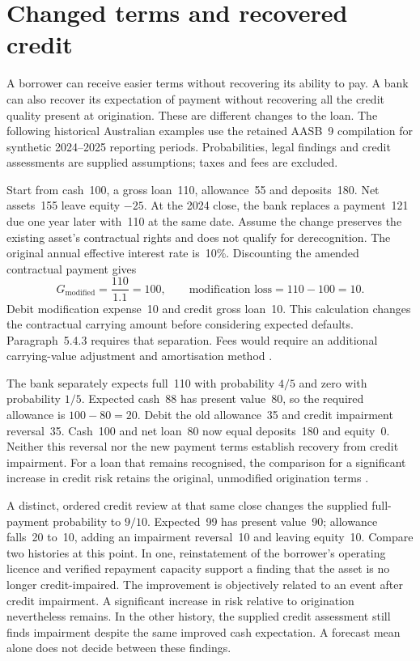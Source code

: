 \section{Changed terms and recovered credit}\label{sec:bank-restructuring}

A borrower can receive easier terms without recovering its ability to pay.
A bank can also recover its expectation of payment without recovering all
the credit quality present at origination. These are different changes to
the loan. The following historical Australian examples use the retained
AASB~9 compilation for synthetic 2024--2025 reporting periods. Probabilities,
legal findings and credit assessments are supplied assumptions; taxes and
fees are excluded.

Start from cash~100, a gross loan~110, allowance~55 and deposits~180. Net assets~155
leave equity $-25$. At the 2024 close, the bank replaces a payment~121 due
one year later with~110 at the same date. Assume the change preserves the
existing asset's contractual rights and does not qualify for derecognition.
The original annual effective interest rate is~10\%. Discounting the amended
contractual payment gives
\[
 G_{\mathrm{modified}}=\frac{110}{1.1}=100,
 \qquad \text{modification loss}=110-100=10.
\]
Debit modification expense~10 and credit gross loan~10. This calculation changes
the contractual carrying amount before considering expected defaults.
Paragraph~5.4.3 requires that separation. Fees would require an additional
carrying-value adjustment and amortisation method
\citep[paragraph~5.4.3]{aasb9dated}.

The bank separately expects full~110 with probability $4/5$ and zero with
probability $1/5$. Expected cash~88 has present value~80, so the required
allowance is $100-80=20$. Debit the old allowance~35 and credit impairment
reversal~35. Cash~100 and net loan~80 now equal deposits~180 and equity~0.
Neither this reversal nor the new payment terms establish recovery from
credit impairment. For a loan that remains recognised, the comparison for a
significant increase in credit risk retains the original, unmodified
origination terms \citep[paragraph~5.5.12 and B5.5.27]{aasb9dated}.

A distinct, ordered credit review at that same close changes the supplied
full-payment probability to $9/10$. Expected~99 has present value~90; allowance
falls~20 to~10, adding an impairment reversal~10 and leaving equity~10.
Compare two histories at this point. In one, reinstatement of the borrower's
operating licence and verified repayment capacity support a finding that the
asset is no longer credit-impaired. The improvement is objectively related to
an event after credit impairment. A significant increase in risk relative to
origination nevertheless remains. In the other history, the supplied credit
assessment still finds impairment despite the same improved cash expectation.
A forecast mean alone does not decide between these findings.

